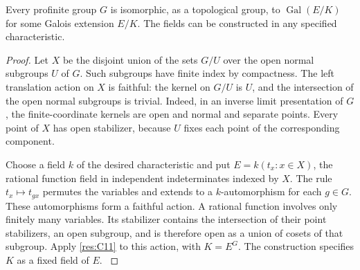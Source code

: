 \begin{corollary}
\label{res:C12}
Every profinite group \(G\) is isomorphic, as a topological
group, to \(\operatorname{Gal}(E/K)\) for some Galois extension
\(E/K\). The fields can be constructed in any specified
characteristic.
\end{corollary}

\begin{proof}
Let \(X\) be the disjoint union of the sets \(G/U\) over the open
normal subgroups \(U\) of \(G\). Such subgroups have finite
index by compactness. The left translation action on \(X\) is
faithful: the kernel on \(G/U\) is \(U\), and the intersection
of the open normal subgroups is trivial. Indeed, in an inverse
limit presentation of \(G\), the finite-coordinate kernels
are open and normal and separate points. Every point of \(X\)
has open stabilizer, because \(U\) fixes each point of the
corresponding component.

Choose a field \(k\) of the desired characteristic and put
\(E=k(t_x:x\in X)\), the rational function field in independent
indeterminates indexed by \(X\). The rule
\(t_x\mapsto t_{g x}\) permutes the variables and extends
to a \(k\)-automorphism for each \(g\in G\). These
automorphisms form a faithful action. A rational function
involves only finitely many variables. Its stabilizer contains
the intersection of their point stabilizers, an open subgroup,
and is therefore open as a union of cosets of that subgroup.
Apply \ref{res:C11} to this action, with \(K=E^G\).
The construction specifies \(K\) as a fixed field of \(E\).
\cite[Proposition 7.27]{milne}
\end{proof}
